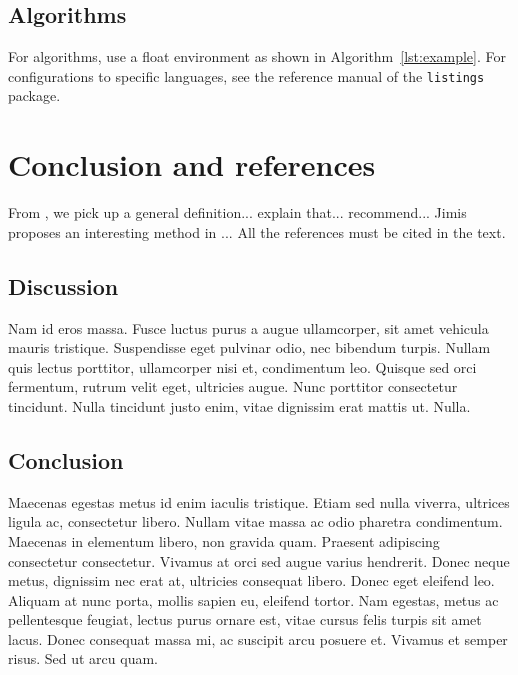 \documentclass{jimis-en}
\begin{document}
\subsection{Algorithms}

For algorithms, use a float environment as shown in Algorithm~\ref{lst:example}. For configurations to specific languages, see the reference manual of the \texttt{listings} package.

\section{Conclusion and references}
From \citet{sinclair91corpus}, we pick up a general definition... \citet{ounis00flidar} explain that... \citet{wood92artifacts} recommend... Jimis proposes an interesting method in \citet{jimis}... All the references must be cited in the text.

\nocite{hentschel07acceptance,biodiversa,pubmed,antonymy02perspective,justeson01cooccurence,r-project,perotti2015,petrone:hal-01191886}

\subsection{Discussion}
Nam id eros massa. Fusce luctus purus a augue ullamcorper, sit amet vehicula mauris
tristique. Suspendisse eget pulvinar odio, nec bibendum turpis. Nullam quis lectus porttitor,
ullamcorper nisi et, condimentum leo. Quisque sed orci fermentum, rutrum velit eget, ultricies
augue. Nunc porttitor consectetur tincidunt. Nulla tincidunt justo enim, vitae dignissim erat
mattis ut. Nulla.

\subsection{Conclusion}
Maecenas egestas metus id enim iaculis tristique. Etiam sed nulla viverra, ultrices ligula ac,
consectetur libero. Nullam vitae massa ac odio pharetra condimentum. Maecenas in
elementum libero, non gravida quam. Praesent adipiscing consectetur consectetur. Vivamus at
orci sed augue varius hendrerit. Donec neque metus, dignissim nec erat at, ultricies consequat
libero. Donec eget eleifend leo. Aliquam at nunc porta, mollis sapien eu, eleifend tortor. Nam
egestas, metus ac pellentesque feugiat, lectus purus ornare est, vitae cursus felis turpis sit amet
lacus. Donec consequat massa mi, ac suscipit arcu posuere et. Vivamus et semper risus. Sed ut
arcu quam.
\end{document}
